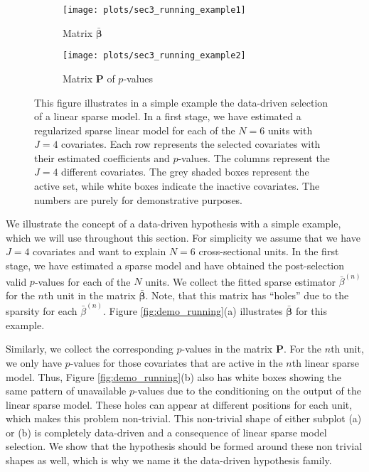 \documentclass[11pt]{article}
\newcommand\tcaptab[1]{\captionsetup{position=top, font=normalsize, labelfont=bf, textfont=normalfont, justification=centering, margin=0mm, aboveskip=1mm, belowskip=0mm, labelsep=colon, singlelinecheck=false}\caption{#1}}
\newcommand\bnotetab[1]{\captionsetup{position=bottom, font=footnotesize,  textfont=normalfont, margin=1mm, skip=2mm, justification=justified, singlelinecheck=false}\caption*{#1}}
\begin{document}
\begin{figure}[t!]
	\tcaptab{Illustrative example of data-driven selection}\label{fig:demo_running}
	\begin{center}\begin{subfigure}[t]{.35\textwidth}
			\texttt{[image: plots/sec3\_running\_example1]}
			\caption{Matrix $\bar{\bm{\beta}}$}
		\end{subfigure}\hspace{2.5cm}
		\begin{subfigure}[t]{.35\textwidth}
			\texttt{[image: plots/sec3\_running\_example2]}
			\caption{Matrix $\bm{P}$ of $p$-values}
	\end{subfigure}\end{center}
	\bnotetab{This figure illustrates in a simple example the data-driven selection of a linear sparse model. In a first stage, we have estimated a regularized sparse linear model for each of the $N=6$ units with $J=4$ covariates. Each row represents the selected covariates with their estimated coefficients and $p$-values. The columns represent the $J=4$ different covariates. The grey shaded boxes represent the active set, while white boxes indicate the inactive covariates. The numbers are purely for demonstrative purposes.}
\end{figure}

We illustrate the concept of a data-driven hypothesis with a simple example, which we will use throughout this section. For simplicity we assume that we have $J=4$ covariates and want to explain $N=6$ cross-sectional units. In the first stage, we have estimated a sparse model and have obtained the post-selection valid $p$-values for each of the $N$ units. We collect the fitted sparse estimator $\bar{\beta}^{(n)}$ for the $n$th unit in the matrix $\bar{\bm\beta}$.  Note, that this matrix has ``holes'' due to the sparsity for each $\bar{\beta}^{(n)}$.  Figure \ref{fig:demo_running}(a) illustrates $\bar{\bm\beta}$ for this example.

Similarly, we collect the corresponding $p$-values in the matrix $\bm{P}$. For the $n$th unit, we only have $p$-values for those covariates that are active in the $n$th linear sparse model. Thus, Figure \ref{fig:demo_running}(b) also has white boxes showing the same pattern of unavailable $p$-values due to the conditioning on the output of the linear sparse model. These holes can appear at different positions for each unit, which makes this problem non-trivial. This non-trivial shape of either subplot (a) or (b) is completely data-driven and a consequence of linear sparse model selection. We show that the hypothesis should be formed around these non trivial shapes as well, which is why we name it the data-driven hypothesis family.  
\end{document}
